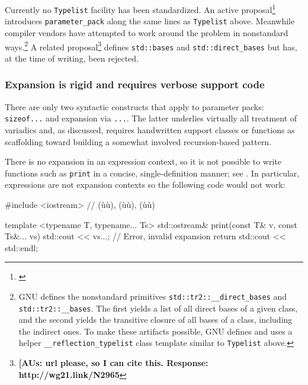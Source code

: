 \noindent Currently no \lstinline!Typelist! facility has been standardized. An active
proposal{\cprotect\footnote{\cite{spertus13}}}
introduces \lstinline!parameter_pack! along the same lines as
\lstinline!Typelist! above. Meanwhile compiler vendors have attempted to
work around the problem in nonstandard ways.{\cprotect\footnote{GNU
defines the nonstandard primitives
\lstinline!std::tr2::__direct_bases! and \lstinline!std::tr2::__bases!.
The first yields a list of all direct bases of a given class, and the
second yields the transitive closure of all bases of a class,
including the indirect ones. To make these artifacts possible, GNU
defines and uses a helper \lstinline!__reflection_typelist! class
  template similar to \lstinline!Typelist! above.}} A related
proposal{\cprotect\footnote{\textbf{[AUs: url please, so I can cite this.  Response: http://wg21.link/N2965}}} defines
\lstinline!std::bases! and \lstinline!std::direct_bases! but has, at the time
of writing, been rejected.

\subsubsection[Expansion is rigid and requires verbose support code]{Expansion is rigid and requires verbose support code}\label{expansion-is-rigid-and-requires-verbose-support-code}

There are only two syntactic constructs that apply to parameter packs:
\lstinline!sizeof...! and expansion via \lstinline!...!. The latter underlies
virtually all treatment of variadics and, as discussed, requires
handwritten support classes or functions as scaffolding toward building
a somewhat involved recursion-based pattern.

There is no expansion in an expression context, so it is not possible to
write functions such as \lstinline!print! in a concise, single-definition
manner; see . In particular, expressions are not expansion contexts so
the following code would not work:

\begin{emcppslisting}
#include <iostream>  // (ù{}ù), (ù{}ù), (ù{}ù)

template <typename T, typename... Ts>
std::ostream& print(const T& v, const Ts&... vs)
{
    std::cout << vs...;             // Error, invalid expansion
    return std::cout << std::endl;
}
\end{emcppslisting}
    

